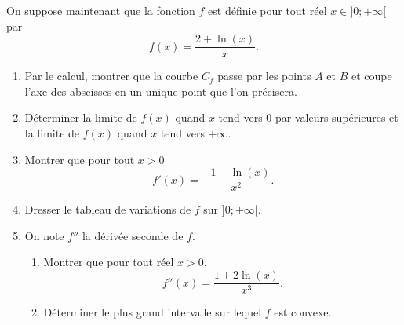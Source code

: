 \documentclass[11pt,fleqn, openany]{book} %
\begin{document}
\begin{exercise}[topic=cvx04, subtitle={(Sujet zéro 2021)}]
On suppose maintenant que la fonction $f$ est définie pour tout réel $x \in ]0;+\infty[$ par
\[f(x)=\dfrac{2+\ln(x)}{x}.\]
\begin{enumerate}
\item Par le calcul, montrer que la courbe $C_f$ passe par les points $A$ et $B$ et coupe l'axe des abscisses en un unique point que l'on précisera.
\item Déterminer la limite de $f(x)$ quand $x$ tend vers 0 par valeurs supérieures et la limite de $f(x)$ quand $x$ tend vers $+\infty$.
\item Montrer que pour tout $x>0$
\[f'(x)=\dfrac{-1-\ln(x)}{x^2}.\]
\item Dresser le tableau de variations de $f$ sur $]0;+\infty [$.
\item On note $f''$ la dérivée seconde de $f$. 
\begin{enumerate}
\item Montrer que pour tout réel $x>0$,
\[f''(x)=\dfrac{1+2\ln(x)}{x^3}.\]
\item Déterminer le plus grand intervalle sur lequel $f$ est convexe.
\end{enumerate}
\end{enumerate}

\end{exercise}
\end{document}
